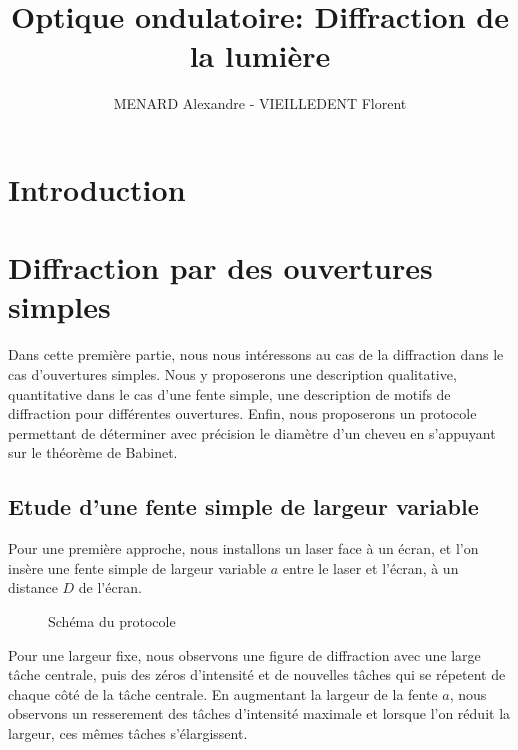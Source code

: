 \documentclass[12pt]{article}
\title{\textbf{Optique ondulatoire:} Diffraction de la lumière}
\author{MENARD Alexandre - VIEILLEDENT Florent}
\begin{document}
\maketitle

\section*{Introduction}

\break
\section{Diffraction par des ouvertures simples}
Dans cette première partie, nous nous intéressons au cas de la diffraction dans le cas d'ouvertures simples. Nous y proposerons une description qualitative, quantitative dans le cas d'une fente simple,
une description de motifs de diffraction pour différentes ouvertures. Enfin, nous proposerons un protocole permettant de déterminer avec précision le diamètre d'un cheveu en s'appuyant sur le théorème de Babinet.
\subsection{Etude d'une fente simple de largeur variable}
Pour une première approche, nous installons un laser face à un écran, et l'on insère une fente simple de largeur variable $a$ entre le laser et l'écran, à un distance $D$ de l'écran.
\begin{figure}[!h]
    \begin{center}
        \resizebox{0.7\textwidth}{5cm}{
        
        }
    \end{center}
    \caption{Schéma du protocole}
\end{figure}

Pour une largeur fixe, nous observons une figure de diffraction avec une large tâche centrale, puis des zéros d'intensité et de nouvelles tâches qui se répetent de chaque côté de la tâche centrale.
En augmentant la largeur de la fente $a$, nous observons un resserement des tâches d'intensité maximale et lorsque l'on réduit la largeur, ces mêmes tâches s'élargissent.
\end{document}
